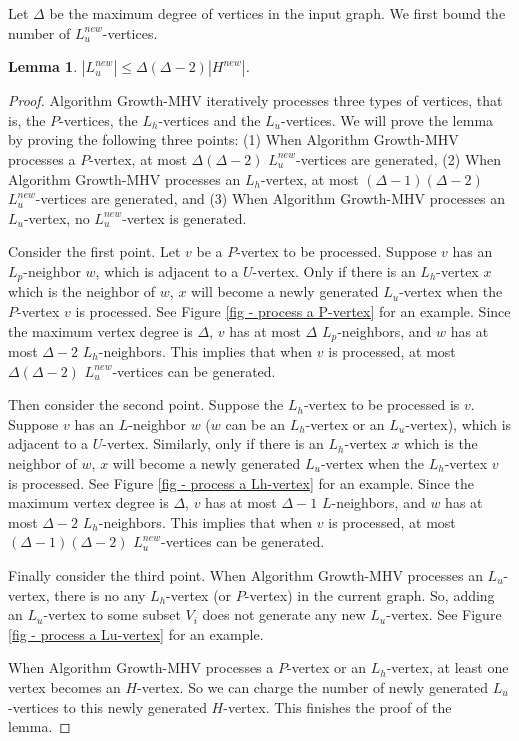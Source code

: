 \documentclass[11pt]{article}
\newtheorem{lemma}{Lemma}[section]
\newcommand{\qed}{\vrule height4pt width4pt depth2pt}
\begin{document}
Let $\Delta$ be the maximum degree of vertices in the input graph.
We first bound the number of $L_{u}^{new}$-vertices.

\begin{lemma}
\label{lm - |L_u^new| <= Delta (Delta-2) |H^new|}
$|L_{u}^{new}| \leq \Delta (\Delta-2) |H^{new}|$.
\end{lemma}
\begin{proof}
Algorithm {\sc Growth-MHV} iteratively processes three types of vertices,
that is, the $P$-vertices, the $L_{h}$-vertices and the $L_{u}$-vertices.
We will prove the lemma by proving the following three points:
(1) When Algorithm {\sc Growth-MHV} processes a $P$-vertex, at most
$\Delta (\Delta-2)$ $L_{u}^{new}$-vertices are generated,
(2) When Algorithm {\sc Growth-MHV} processes an $L_{h}$-vertex, at most
$(\Delta-1)(\Delta-2)$ $L_{u}^{new}$-vertices are generated, and
(3) When Algorithm {\sc Growth-MHV} processes an $L_{u}$-vertex,
no $L_{u}^{new}$-vertex is generated.

Consider the first point. Let $v$ be a $P$-vertex to be processed.
Suppose $v$ has an $L_p$-neighbor $w$, which is adjacent to a $U$-vertex.
Only if there is an $L_{h}$-vertex $x$ which is the neighbor of $w$,
$x$ will become a newly generated $L_{u}$-vertex when the $P$-vertex $v$
is processed. See Figure \ref{fig - process a P-vertex} for an example.
Since the maximum vertex degree is $\Delta$, $v$ has at most $\Delta$
$L_p$-neighbors, and $w$ has at most $\Delta - 2$ $L_{h}$-neighbors.
This implies that when $v$ is processed, at most $\Delta (\Delta-2)$
$L_{u}^{new}$-vertices can be generated.

Then consider the second point. Suppose the $L_{h}$-vertex to be processed
is $v$. Suppose $v$ has an $L$-neighbor $w$ ($w$ can be an $L_{h}$-vertex or
an $L_{u}$-vertex), which is adjacent to a $U$-vertex. Similarly,
only if there is an $L_{h}$-vertex $x$ which is the neighbor of $w$,
$x$ will become a newly generated $L_{u}$-vertex when the $L_{h}$-vertex $v$
is processed. See Figure \ref{fig - process a Lh-vertex} for an example.
Since the maximum vertex degree is $\Delta$, $v$ has at most $\Delta - 1$
$L$-neighbors, and $w$ has at most $\Delta - 2$ $L_{h}$-neighbors.
This implies that when $v$ is processed, at most $(\Delta-1)(\Delta-2)$
$L_{u}^{new}$-vertices can be generated.

Finally consider the third point. When Algorithm {\sc Growth-MHV} processes
an $L_{u}$-vertex, there is no any $L_{h}$-vertex (or $P$-vertex) in the
current graph. So, adding an $L_{u}$-vertex to some subset $V_i$
does not generate any new $L_{u}$-vertex.
See Figure \ref{fig - process a Lu-vertex} for an example.

When Algorithm {\sc Growth-MHV} processes a $P$-vertex or an $L_{h}$-vertex,
at least one vertex becomes an $H$-vertex. So we can charge the number of
newly generated $L_{u}$-vertices to this newly generated $H$-vertex.
This finishes the proof of the lemma.
\qed
\end{proof}
\end{document}
